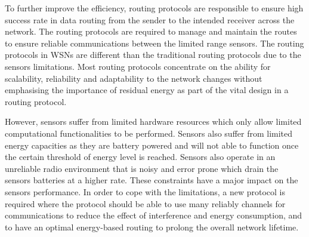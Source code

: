To further improve the efficiency, routing protocols are responsible to ensure high success rate in data routing from the sender to the intended receiver across the network. 
The routing protocols are required to manage and maintain the routes to ensure reliable communications between the limited range sensors. The routing protocols in WSNs are different than the traditional routing protocols due to the sensors limitations. 
Most routing protocols concentrate on the ability for scalability, reliability and adaptability to the network changes without emphasising the importance of residual energy as part of the vital design in a routing protocol.

However, sensors suffer from limited hardware resources which only allow limited computational functionalities to be performed. Sensors also suffer from limited energy capacities as they are battery powered and will not able to function once the certain threshold of energy level is reached. 
Sensors also operate in an unreliable radio environment that is noisy and error prone which drain the sensors batteries at a higher rate. These constraints have a major impact on the sensors performance. 
In order to cope with the limitations, a new protocol is required where the protocol should be able to use many reliably channels for communications to reduce the effect of interference and energy consumption, and to have an optimal energy-based routing to prolong the overall network lifetime.




